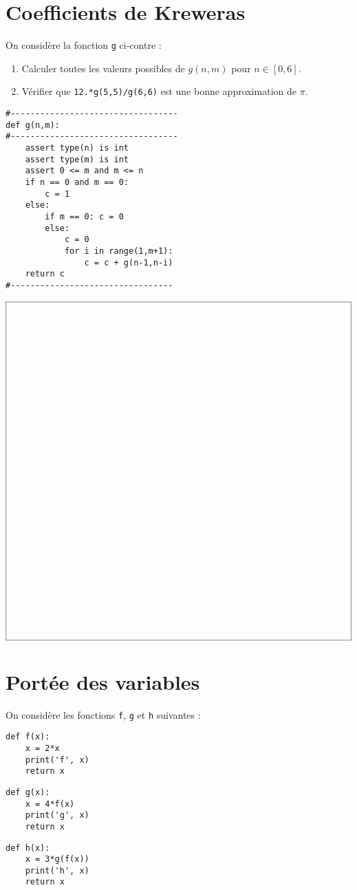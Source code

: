 \documentclass[11pt,a4paper]{article}
\begin{document}
\section{Coefficients de Kreweras}
\begin{minipage}[t]{7cm}
On consid\`ere la fonction {\tt g} ci-contre :
\begin{enumerate}
\item Calculer toutes les valeurs possibles
	de $g(n,m)$ pour $n \in [0,6]$.
\item Vérifier que {\tt 12.*g(5,5)/g(6,6)} est une bonne approximation de
	$\pi$.
\end{enumerate}
\end{minipage}
\hfill
\begin{minipage}[t]{7cm}\footnotesize
\begin{verbatim}
#----------------------------------
def g(n,m):
#----------------------------------
    assert type(n) is int
    assert type(m) is int
    assert 0 <= m and m <= n
    if n == 0 and m == 0:
        c = 1
    else:
        if m == 0: c = 0
        else:
            c = 0
            for i in range(1,m+1):
                c = c + g(n-1,n-i)
    return c
#---------------------------------
\end{verbatim}
\end{minipage}


$$\framebox[14.5cm]{$\rule{0cm}{14cm}$}$$

\section{Portée des variables}
On considère les fonctions {\tt f}, {\tt g} et {\tt h} suivantes :
\begin{center}
\begin{py}{4cm}
\begin{verbatim}
def f(x):
    x = 2*x
    print('f', x)
    return x
\end{verbatim}
\end{py}\hspace*{1cm}
\begin{py}{4cm}
\begin{verbatim}
def g(x):
    x = 4*f(x)
    print('g', x)
    return x
\end{verbatim}
\end{py}\hspace*{1cm}
\begin{py}{4cm}
\begin{verbatim}
def h(x):
    x = 3*g(f(x))
    print('h', x)
    return x
\end{verbatim}
\end{py}
\end{center}
\end{document}
